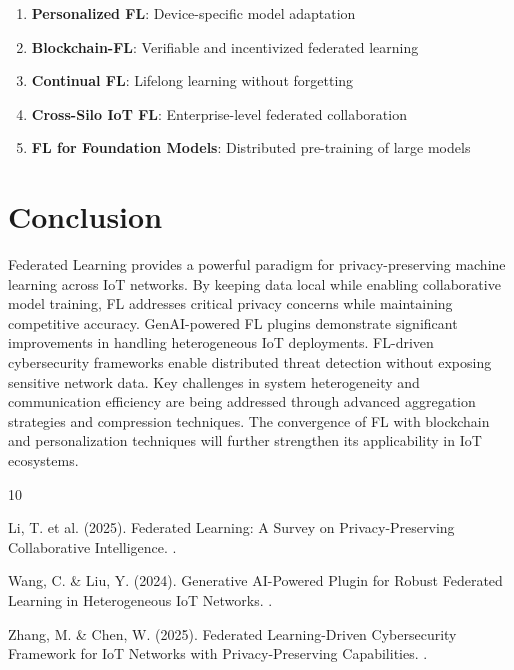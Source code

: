 \documentclass[12pt,a4paper]{article}
\begin{document}
\begin{enumerate}
    \item \textbf{Personalized FL}: Device-specific model adaptation
    \item \textbf{Blockchain-FL}: Verifiable and incentivized federated learning
    \item \textbf{Continual FL}: Lifelong learning without forgetting
    \item \textbf{Cross-Silo IoT FL}: Enterprise-level federated collaboration
    \item \textbf{FL for Foundation Models}: Distributed pre-training of large models
\end{enumerate}

\section{Conclusion}

Federated Learning provides a powerful paradigm for privacy-preserving machine learning across IoT networks. By keeping data local while enabling collaborative model training, FL addresses critical privacy concerns while maintaining competitive accuracy. GenAI-powered FL plugins demonstrate significant improvements in handling heterogeneous IoT deployments. FL-driven cybersecurity frameworks enable distributed threat detection without exposing sensitive network data. Key challenges in system heterogeneity and communication efficiency are being addressed through advanced aggregation strategies and compression techniques. The convergence of FL with blockchain and personalization techniques will further strengthen its applicability in IoT ecosystems.


\begin{thebibliography}{10}

Li, T. et al. (2025).
\newblock Federated Learning: A Survey on Privacy-Preserving Collaborative Intelligence.
.

Wang, C. \& Liu, Y. (2024).
\newblock Generative AI-Powered Plugin for Robust Federated Learning in Heterogeneous IoT Networks.
.

Zhang, M. \& Chen, W. (2025).
\newblock Federated Learning-Driven Cybersecurity Framework for IoT Networks with Privacy-Preserving Capabilities.
.

\end{thebibliography}
\end{document}
